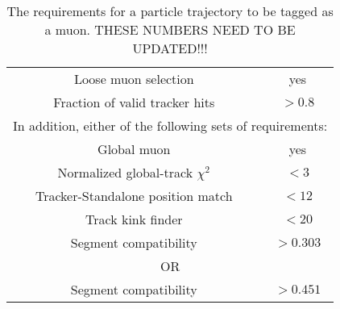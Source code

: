 \begin{table}
 \centering
 \begin{tabular}{|*{2}{c|}}
 \hline
Loose muon selection & yes \\ 
Fraction of valid tracker hits & $> 0.8$ \\
\hline
\multicolumn{2}{|c|}{In addition, either of the following sets of requirements:} \\
\hline
Global muon & yes \\
Normalized global-track $\chi^2$ & $< 3$ \\
Tracker-Standalone position match & $< 12$ \\
Track kink finder & $< 20$ \\
Segment compatibility & $>0.303$ \\
\hline
\multicolumn{2}{|c|}{OR} \\
\hline
Segment compatibility & $> 0.451$ \\
\hline
 \end{tabular}
 \caption[Muon Identification Parameters]{The requirements for a particle trajectory to be tagged as a muon. THESE NUMBERS NEED TO BE UPDATED!!!}
 \label{MuonID}
 \end{table}
 
 
